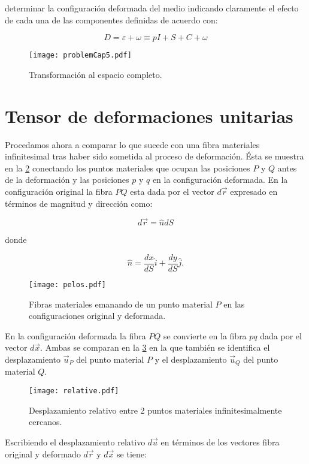 \documentclass[../notas medios.tex]{subfiles}
\begin{document}
determinar la configuración deformada del medio indicando claramente el efecto de cada una de las componentes definidas de acuerdo con:


\[D = \varepsilon  + \omega  \equiv pI + S + C + \omega \]


\begin{figure}[H]
\centering
	\texttt{[image: problemCap5.pdf]}
	\caption{Transformación al espacio completo.}
	\label{problem}
\end{figure}


\section{Tensor de deformaciones unitarias}
Procedamos ahora a comparar lo que sucede con una fibra materiales infinitesimal tras haber sido sometida al proceso de deformación. Ésta se muestra en la \cref{pelos} conectando los puntos materiales que ocupan las posiciones $P$ y $Q$ antes de la deformación y las posiciones $p$ y $q$ en la configuración deformada. En la configuración original la fibra $PQ$ esta dada por el vector $d\vec{r}$ expresado en términos de magnitud y dirección como:

\[d\vec r = \hat ndS\]

donde

\[\hat n = \frac{{dx}}{{dS}}\hat i + \frac{{dy}}{{dS}}\hat j.\]

\begin{figure}[H]
\centering
	\texttt{[image: pelos.pdf]}
	\caption{Fibras materiales emanando de un punto material $P$ en las configuraciones original y deformada.}
	\label{pelos}
\end{figure}

En la configuración deformada la fibra $PQ$ se convierte en la fibra $pq$ dada por el vector $d\vec{x}$. Ambas se comparan en la \cref{relative} en la que también se identifica el desplazamiento ${{\vec u}_P}$ del punto material $P$ y el desplazamiento ${{\vec u}_Q}$  del punto material $Q$.

\begin{figure}[H]
\centering
	\texttt{[image: relative.pdf]}
	\caption{Desplazamiento relativo entre 2 puntos materiales infinitesimalmente cercanos.}
	\label{relative}
\end{figure}

Escribiendo el desplazamiento relativo $d\vec u$  en términos de los vectores fibra original y deformado $d\vec{r}$ y $d\vec{x}$  se tiene:
\end{document}
